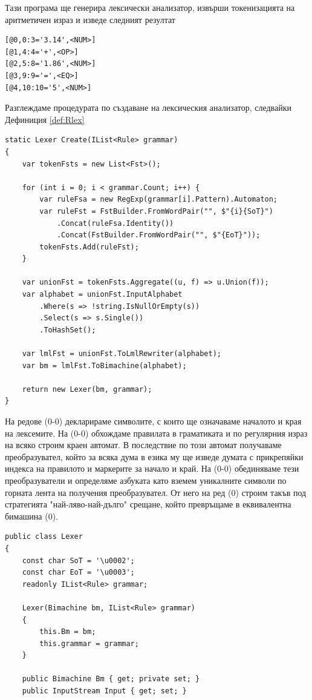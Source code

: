 \documentclass[12pt, oneside]{article}
\theoremstyle{definition}
\begin{document}
Тази програма ще генерира лексически анализатор, извърши токенизацията на аритметичен израз и изведе следният резултат

\begin{verbatim}
[@0,0:3='3.14',<NUM>]
[@1,4:4='+',<OP>]
[@2,5:8='1.86',<NUM>]
[@3,9:9='=',<EQ>]
[@4,10:10='5',<NUM>]
\end{verbatim}

Разглеждаме процедурата по създаване на лексическия анализатор, следвайки Дефиниция \ref{def:Rlex}

\begin{verbatim}
static Lexer Create(IList<Rule> grammar)
{
	var tokenFsts = new List<Fst>();

	for (int i = 0; i < grammar.Count; i++) {
		var ruleFsa = new RegExp(grammar[i].Pattern).Automaton;
		var ruleFst = FstBuilder.FromWordPair("", $"{i}{SoT}")
			.Concat(ruleFsa.Identity())
			.Concat(FstBuilder.FromWordPair("", $"{EoT}"));
		tokenFsts.Add(ruleFst);
	}

	var unionFst = tokenFsts.Aggregate((u, f) => u.Union(f));
	var alphabet = unionFst.InputAlphabet
		.Where(s => !string.IsNullOrEmpty(s))
		.Select(s => s.Single())
		.ToHashSet();

	var lmlFst = unionFst.ToLmlRewriter(alphabet);
	var bm = lmlFst.ToBimachine(alphabet);

	return new Lexer(bm, grammar);
}
\end{verbatim}

На редове (0-0) декларираме символите, с които ще означаваме началото и края на лексемите. На (0-0) обхождаме правилата в граматиката и по регулярния израз на всяко строим краен автомат. В последствие по този автомат получаваме преобразувател, който за всяка дума в езика му ще изведе думата с прикрепяйки индекса на правилото и маркерите за начало и край. На (0-0) обединяваме тези преобразуватели и определяме азбуката като вземем уникалните символи по горната лента на получения преобразувател. От него на ред (0) строим такъв под стратегията "най-ляво-най-дълго" срещане, който превръщаме в еквивалентна бимашина (0).

\begin{verbatim}
public class Lexer
{
	const char SoT = '\u0002';
	const char EoT = '\u0003';
	readonly IList<Rule> grammar;

	Lexer(Bimachine bm, IList<Rule> grammar) 
	{
        this.Bm = bm;
        this.grammar = grammar;
    }

    public Bimachine Bm { get; private set; }
	public InputStream Input { get; set; }

\end{verbatim}
\end{document}
